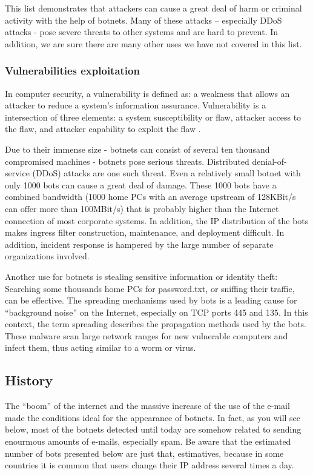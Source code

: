 \documentclass[]{article}
\begin{document}
This list demonstrates that attackers can cause a great deal of harm or criminal activity with the help of botnets. Many of these attacks – especially DDoS attacks - pose severe threats to other systems and are hard to prevent. In addition, we are sure there are many other uses we have not covered in this list.

\subsubsection{Vulnerabilities exploitation}

In computer security, a vulnerability is defined as: a weakness that allows an attacker to reduce a system’s information assurance. Vulnerability is a intersection of three elements: a system susceptibility or flaw, attacker access to the flaw, and attacker capability to exploit the flaw \cite{article:sans}.

Due to their immense size - botnets can consist of several ten thousand compromised machines - botnets pose serious threats. Distributed denial-of-service (DDoS) attacks are one such threat. Even a relatively small botnet with only 1000 bots can cause a great deal of damage. These 1000 bots have a combined bandwidth (1000 home PCs with an average upstream of 128KBit/s can offer more than 100MBit/s) that is probably higher than the Internet connection of most corporate systems. In addition, the IP distribution of the bots makes ingress filter construction, maintenance, and deployment difficult. In addition, incident response is hampered by the large number of separate organizations involved.

Another use for botnets is stealing sensitive information or identity theft: Searching some thousands home PCs for password.txt, or sniffing their traffic, can be effective. The spreading mechanisms used by bots is a leading cause for “background noise” on the Internet, especially on TCP ports 445 and 135. In this context, the term spreading describes the propagation methods used by the bots. These malware scan large network ranges for new vulnerable computers and infect them, thus acting similar to a worm or virus.

\subsection{History}

The “boom” of the internet and the massive increase of the use of the e-mail made the conditions ideal for the appearance of botnets. In fact, as you will see below, most of the botnets detected until today are somehow related to sending enourmous amounts of e-mails, especially spam. Be aware that the estimated number of bots presented below are just that, estimatives, because in some countries it is common that users change their IP address several times a day.
\end{document}
